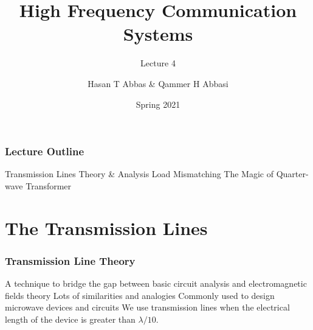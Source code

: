 \documentclass[10pt, compress]{beamer}
\title{High Frequency Communication Systems}
\subtitle{Lecture 4}
\date{Spring 2021}
\author{Hasan T Abbas \& Qammer H Abbasi}
\begin{document}
\maketitle

\begin{frame}[fragile]
  \frametitle{Lecture Outline}
\begin{outline}[itemize]
  \1 Transmission Lines Theory \& Analysis
  \1 Load Mismatching
  \1 The Magic of Quarter-wave Transformer
\end{outline}
\end{frame}
\section{The Transmission Lines}

\begin{frame}[fragile]
\frametitle{Transmission Line Theory}
\begin{outline}
  \1 A technique to bridge the gap between basic circuit analysis and electromagnetic fields theory
   \2 Lots of similarities and analogies
    \1 Commonly used to design microwave devices and circuits
    \1 We use transmission lines when the electrical length of the device is greater than $\lambda / 10$.
\end{outline}
\end{frame}
\end{document}
